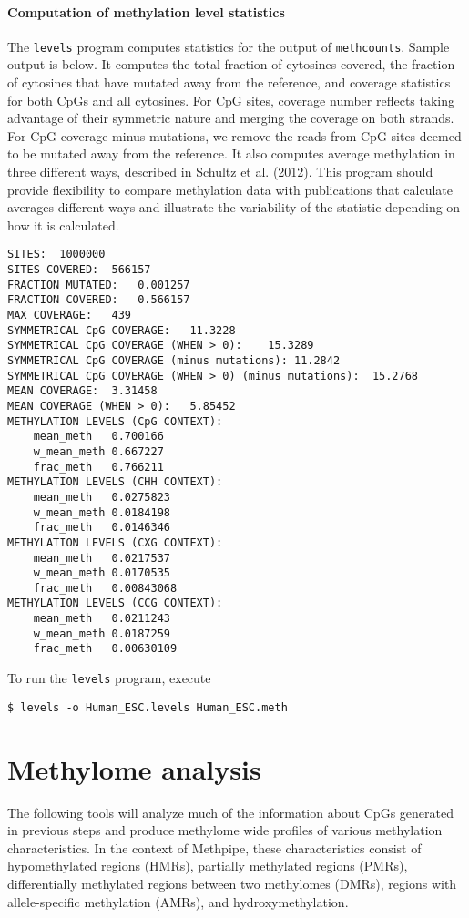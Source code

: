 \documentclass[10pt]{article}
\newcommand{\prog}[1]{\texttt{#1}}
\begin{document}
\paragraph{Computation of methylation level statistics}
The \prog{levels} program computes statistics for the output of
\prog{methcounts}. Sample output is below. It computes the total
fraction of cytosines covered, the fraction of cytosines that have
mutated away from the reference, and coverage statistics for both
CpGs and all cytosines. For CpG sites, coverage number reflects taking
advantage of their symmetric nature and merging the coverage on both
strands. For CpG coverage minus mutations, we remove the reads from
CpG sites deemed to be mutated away from the reference. It also computes
average methylation in three different ways, described in Schultz et al.
(2012). This program should provide flexibility to compare methylation data
with publications that calculate averages different ways and illustrate the
variability of the statistic depending on how it is calculated.

\begin{verbatim}
SITES:	1000000
SITES COVERED:	566157
FRACTION MUTATED:	0.001257
FRACTION COVERED:	0.566157
MAX COVERAGE:	439
SYMMETRICAL CpG COVERAGE:	11.3228
SYMMETRICAL CpG COVERAGE (WHEN > 0):	15.3289
SYMMETRICAL CpG COVERAGE (minus mutations):	11.2842
SYMMETRICAL CpG COVERAGE (WHEN > 0) (minus mutations):	15.2768
MEAN COVERAGE:	3.31458
MEAN COVERAGE (WHEN > 0):	5.85452
METHYLATION LEVELS (CpG CONTEXT):
	mean_meth	0.700166
	w_mean_meth	0.667227
	frac_meth	0.766211	
METHYLATION LEVELS (CHH CONTEXT):
	mean_meth	0.0275823
	w_mean_meth	0.0184198
	frac_meth	0.0146346	
METHYLATION LEVELS (CXG CONTEXT):
	mean_meth	0.0217537
	w_mean_meth	0.0170535
	frac_meth	0.00843068	
METHYLATION LEVELS (CCG CONTEXT):
	mean_meth	0.0211243
	w_mean_meth	0.0187259
	frac_meth	0.00630109
\end{verbatim}

To run the \prog{levels} program, execute

\begin{verbatim}
$ levels -o Human_ESC.levels Human_ESC.meth
\end{verbatim}

\section{Methylome analysis}
\label{sec:high-level-analys}

The following tools will analyze much of the information about CpGs
generated in previous steps and produce methylome wide profiles of
various methylation characteristics. In the context of Methpipe, these
characteristics consist of hypomethylated regions (HMRs), partially
methylated regions (PMRs), differentially methylated regions between
two methylomes (DMRs), regions with allele-specific methylation (AMRs),
and hydroxymethylation.
\end{document}
